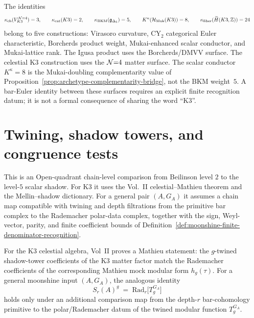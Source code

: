 \begin{remark}
\label{rem:mathieu-k3-values-separated}
The identities
\[
 \kappa_{\mathrm{ch}}(V_{K3}^{\mathcal N{=}4})=3,\qquad
 \kappa_{\mathrm{cat}}(K3)=2,\qquad
 \kappa_{\mathrm{BKM}}(\mathfrak g_{\Delta_5})=5,\qquad
 K^\kappa(\mathcal H_{\mathrm{Muk}}(K3))=8,\qquad
 \kappa_{\mathrm{fiber}}(\widetilde H(K3,\mathbb Z))=24
\]
belong to five constructions: Virasoro curvature, CY$_2$ categorical
Euler characteristic, Borcherds product weight, Mukai-enhanced scalar
conductor, and Mukai-lattice rank.  The Igusa product uses the
Borcherds/DMVV surface.  The celestial K3 construction uses the
$\mathcal N{=}4$ matter surface.  The scalar conductor $K^\kappa=8$ is the
Mukai-doubling complementarity value of
Proposition~\ref{prop:archetype-complementarity-bridge}, not the BKM
weight~$5$.  A bar-Euler identity between these surfaces requires an
explicit finite recognition datum; it is not a formal consequence of
sharing the word ``K3''.
\end{remark}

\section{Twining, shadow towers, and congruence tests}
\label{sec:shadow-tower-twining}

\begin{theorem}
\label{thm:shadow-tower-twining-universality}
This is an Open-quadrant chain-level comparison from Beilinson level
$2$ to the level-$5$ scalar shadow. For K3 it uses the Vol.~II
celestial--Mathieu theorem and the Mellin--shadow dictionary. For a
general pair $(A,G_A)$ it assumes a chain map compatible with
twining and depth filtrations from the primitive bar complex to the
Rademacher polar-data complex, together with the sign, Weyl-vector,
parity, and finite coefficient bounds of
Definition~\ref{def:moonshine-finite-denominator-recognition}.

For the K3 celestial algebra, Vol~II proves a Mathieu statement:
the $g$-twined shadow-tower coefficients of the K3 matter factor
match the Rademacher coefficients of the corresponding Mathieu mock
modular form $h_g(\tau)$.  For a general moonshine input
$(A,G_A)$, the analogous identity
\begin{equation}
\label{eq:shadow-tower-mck-thompson}
S_r(A)^g
\;=\;
\mathrm{Rad}_r\!\bigl[T^{G_A}_g\bigr]
\end{equation}
holds only under an additional comparison map from the depth-$r$
bar-cohomology primitive to the polar/Rademacher datum of the
twined modular function $T^{G_A}_g$.
\end{theorem}

